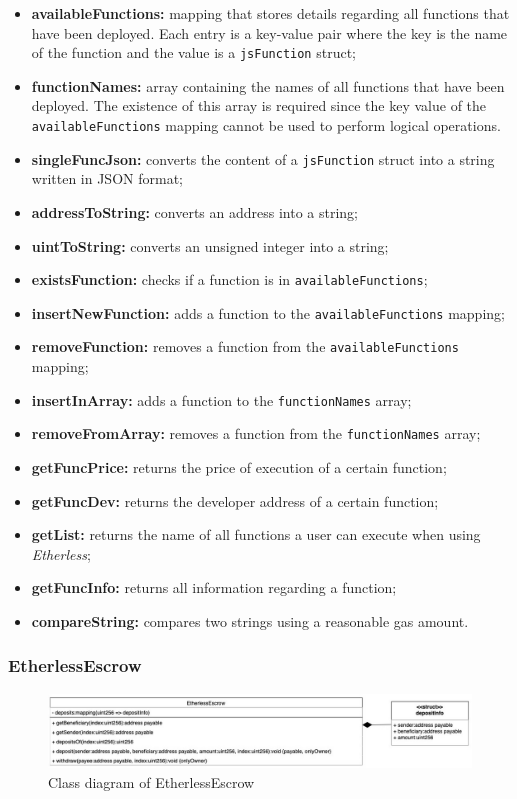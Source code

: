 	\begin{itemize}
		\item \textbf{availableFunctions:} mapping that stores details regarding all functions that have been deployed. Each entry is a key-value pair where the key is the name of the function and the value is a \texttt{jsFunction} struct;
		\item \textbf{functionNames:} array containing the names of all functions that have been deployed. The existence of this array is required since the key value of the \texttt{availableFunctions} mapping cannot be used to perform logical operations.
	\end{itemize}
	\begin{itemize}
		\item \textbf{singleFuncJson:} converts the content of a \texttt{jsFunction} struct into a string written in JSON format;
		\item \textbf{addressToString:} converts an address into a string;
		\item \textbf{uintToString:} converts an unsigned integer into a string;
		\item \textbf{existsFunction:} checks if a function is in \texttt{availableFunctions};
		\item \textbf{insertNewFunction:} adds a function to the \texttt{availableFunctions} mapping;
		\item \textbf{removeFunction:} removes a function from the \texttt{availableFunctions} mapping;
		\item \textbf{insertInArray:} adds a function to the \texttt{functionNames} array;
		\item \textbf{removeFromArray:} removes a function from the \texttt{functionNames} array;
		\item \textbf{getFuncPrice:} returns the price of execution of a certain function;
		\item \textbf{getFuncDev:} returns the developer address of a certain function;
		\item \textbf{getList:} returns the name of all functions a user can execute when using \textit{Etherless};
		\item \textbf{getFuncInfo:} returns all information regarding a function;
		\item \textbf{compareString:} compares two strings using a reasonable gas amount.
	\end{itemize}

\subsubsection{EtherlessEscrow}
	\begin{figure}[H]
		\centering
		\includegraphics[width=1\linewidth]{diagrammi/etherless-smart/EtherlessEscrow.jpg}
		\caption{Class diagram of EtherlessEscrow}
	\end{figure}

